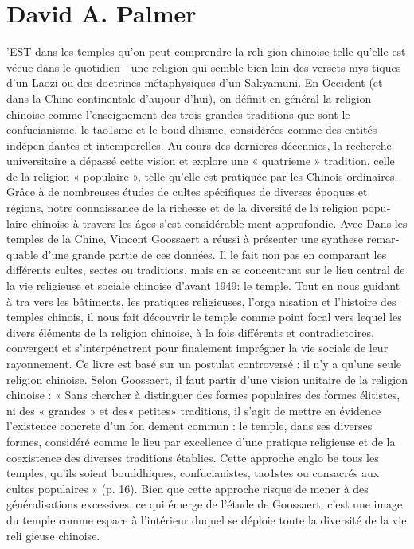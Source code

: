 \section{David A. Palmer}

'EST dans les temples qu'on peut comprendre la reli­
gion chinoise telle qu'elle est vécue dans le quotidien
- une religion qui semble bien loin des versets mys­ tiques d'un Laozi ou des
doctrines métaphysiques d'un Sakyamuni. En Occident (et dans la Chine continentale d'aujour­ d'hui), on définit en général la religion chinoise comme l'enseignement des trois grandes traditions que sont le confucianisme, le tao1sme et le boud­ dhisme, considérées comme des entités indépen­ dantes et intemporelles. Au cours des dernieres décennies, la recherche universitaire a dépassé cette vision et explore une « quatrieme » tradition, celle de la religion « populaire », telle qu'elle est pratiquée par les Chinois ordinaires. Grâce à de nombreuses études de cultes spécifiques de diverses époques et régions, notre connaissance de la richesse et de la diversité de la religion popu­ laire chinoise à travers les âges s'est considérable­ ment approfondie.
Avec Dans les temples de la Chine, Vincent Goossaert a réussi à présenter une synthese remar­ quable d'une grande partie de ces données. Il le fait non pas en comparant les différents cultes, sectes ou traditions, mais en se concentrant sur le lieu central de la vie religieuse et sociale chinoise d'avant 1949: le temple. Tout en nous guidant à tra­ vers les bâtiments, les pratiques religieuses, l'orga­ nisation et l'histoire des temples chinois, il nous fait découvrir le temple comme point focal vers lequel les divers éléments de la religion chinoise, à la fois différents et contradictoires, convergent et s'interpénetrent pour finalement imprégner la vie sociale de leur rayonnement.
Ce livre est basé sur un postulat controversé : il
n'y a qu'une seule religion chinoise. Selon
Goossaert, il faut partir d'une vision unitaire de la religion chinoise : « Sans chercher à distinguer des formes populaires des formes élitistes, ni des
« grandes » et des« petites» traditions, il s'agit de mettre en évidence l'existence concrete d'un fon­ dement commun : le temple, dans ses diverses formes, considéré comme le lieu par excellence d'une pratique religieuse et de la coexistence des diverses traditions établies. Cette approche englo­ be tous les temples, qu'ils soient bouddhiques, confucianistes, tao1stes ou consacrés aux cultes populaires » (p. 16). Bien que cette approche risque de mener à des généralisations excessives, ce qui émerge de l'étude de Goossaert, c'est une image du temple comme espace à l'intérieur duquel se déploie toute la diversité de la vie reli­ gieuse chinoise.
